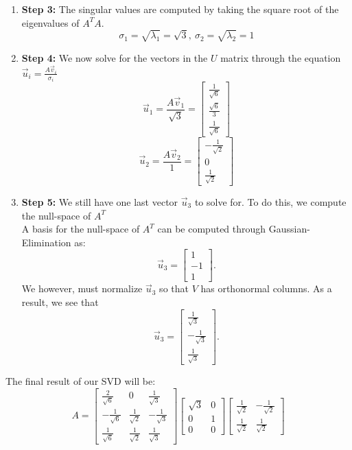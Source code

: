 \begin{enumerate}
{\begin{enumerate}[label=(\roman*)]
        Remember to normalize these vectors since they form the $V$ matrix.
      \item \textbf{Step 3:}
        The singular values are computed by taking the square root of the eigenvalues of $A^{T}A.$
        $$\sigma_{1} = \sqrt{\lambda_{1}} = \sqrt{3}, \ \sigma_{2} = \sqrt{\lambda_{2}} = 1$$
      \item \textbf{Step 4:}
        We now solve for the vectors in the $U$ matrix through the equation $\vec{u}_i = \frac{A \vec{v}_i}{\sigma_i}$
        $$\vec{u}_{1} = \frac{A \vec{v}_{1}}{\sqrt{3}} = 
        \begin{bmatrix} \frac{1}{\sqrt{6}} \\ \frac{\sqrt{6}}{3} \\ \frac{1}{\sqrt{6}} \end{bmatrix}$$
        $$\vec{u}_{2} = \frac{A \vec{v}_{2}}{1} = 
        \begin{bmatrix} -\frac{1}{\sqrt{2}} \\ 0 \\ \frac{1}{\sqrt{2}} \end{bmatrix}$$
      \item \textbf{Step 5:}
        We still have one last vector $\vec{u}_{3}$ to solve for. To do this, we compute the null-space of $A^{T}$ \\
        A basis for the null-space of $A^{T}$ can be computed through Gaussian-Elimination as:
        $$\vec{u}_{3} = \begin{bmatrix} 1 \\ -1 \\ 1 \end{bmatrix}.$$
        We however, must normalize $\vec{u}_{3}$ so that $V$ has orthonormal columns. As a result, we see that
        $$\vec{u}_{3} = \begin{bmatrix} \frac{1}{\sqrt{3}} \\ - \frac{1}{\sqrt{3}} \\ \frac{1}{\sqrt{3}} \end{bmatrix}.$$
    \end{enumerate}
    The final result of our SVD will be:
    \begin{equation}
      A = \begin{bmatrix} \frac{2}{\sqrt{6}} & 0 & \frac{1}{\sqrt{3}} \\
      -\frac{1}{\sqrt{6}} & \frac{1}{\sqrt{2}} & -\frac{1}{\sqrt{3}} \\
      \frac{1}{\sqrt{6}} & \frac{1}{\sqrt{2}} & \frac{1}{\sqrt{3}} \end{bmatrix}
      \begin{bmatrix} \sqrt{3} & 0  \\ 0 & 1 \\ 0 & 0 \end{bmatrix} 
      \begin{bmatrix} \frac{1}{\sqrt{2}} & -\frac{1}{\sqrt{2}} \\ \frac{1}{\sqrt{2}} & \frac{1}{\sqrt{2}} \end{bmatrix}
    \end{equation}
  }
\end{enumerate}









